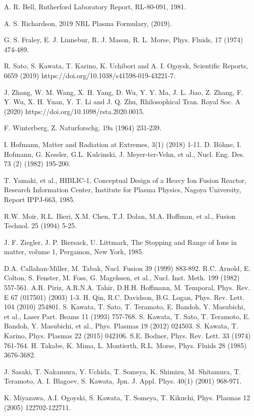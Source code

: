 \begin{thebibliography}{99}
A. R. Bell, Rutherford Laboratory Report, RL-80-091, 1981. 

A. S. Richardson, 2019 NRL Plasma Formulary, (2019). 

G. S. Fraley, E. J. Linnebur, R. J. Mason, R. L. Morse, Phys. Fluids, 17 (1974) 474-489. 

R. Sato, S. Kawata, T. Karino, K. Uchibori and A. I. Ogoysk, Scientific Reports, 6659 (2019) https://doi.org/10.1038/s41598-019-43221-7. 

J. Zhang, W. M. Wang, X. H. Yang, D. Wu, Y. Y. Ma, J. L. Jiao, Z. Zhang, F. Y. Wu, X. H. Yuan, Y. T. Li and J. Q. Zhu, Rhilosophical Tran. Royal Soc. A (2020) https://doi.org/10.1098/rsta.2020.0015. 

F. Winterberg, Z. Naturforschg. 19a (1964) 231-239. 

I. Hofmann, Matter and Radiation at Extremes, 3(1) (2018) 1-11.  
D. B\"{o}hne, I. Hofmann, G. Kessler, G.L. Kulcinski, J. Meyer-ter-Vehn, et al., Nucl. Eng. Des. 73 (2) (1982) 195-200. 

T. Yamaki, et al., HIBLIC-1, Conceptual Design of a Heavy Ion Fusion Reactor, Research Information Center, Institute for Plasma Physics, Nagoya University, Report IPPJ-663, 1985.

R.W. Moir, R.L. Bieri, X.M. Chen, T.J. Dolan, M.A. Hoffman, et al., Fusion Technol. 25 (1994) 5-25.

 J. F. Ziegler, J. P. Biersack, U. Littmark, The Stopping and Range of Ions in matter, volume 1, Pergamon, New York, 1985.

D.A. Callahan-Miller, M. Tabak, Nucl. Fusion 39 (1999) 883-892.
R.C. Arnold, E. Colton, S. Fenster, M. Foss, G. Magelssen, et al., Nucl. Inst. Meth. 199 (1982) 557-561.
A.R. Piriz, A.R.N.A. Tahir, D.H.H. Hoffmann, M. Temporal, Phys. Rev. E 67 (017501) (2003) 1-3.
H. Qin, R.C. Davidson, B.G. Logan, Phys. Rev. Lett. 104 (2010) 254801.
S. Kawata, T. Sato, T. Teramoto, E. Bandoh, Y. Masubichi, et al., Laser Part. Beams 11 (1993) 757-768.
S. Kawata, T. Sato, T. Teramoto, E. Bandoh, Y. Masubichi, et al., Phys. Plasmas 19 (2012) 024503.
S. Kawata, T. Karino, Phys. Plasmas 22 (2015) 042106.
S.E. Bodner, Phys. Rev. Lett. 33 (1974) 761-764.
H. Takabe, K. Mima, L. Montierth, R.L. Morse, Phys. Fluids 28 (1985) 3676-3682. 

 J. Sasaki, T. Nakamura, Y. Uchida, T. Someya, K. Shimizu, M. Shitamura, T. Teramoto, A. I. Blagoev, S. Kawata, Jpn. J. Appl. Phys. 40(1) (2001) 968-971.

K. Miyazawa, A.I. Ogoyski, S. Kawata, T. Someya, T. Kikuchi, Phys. Plasmas 12 (2005) 122702-122711.
\fi

 \end{thebibliography}
